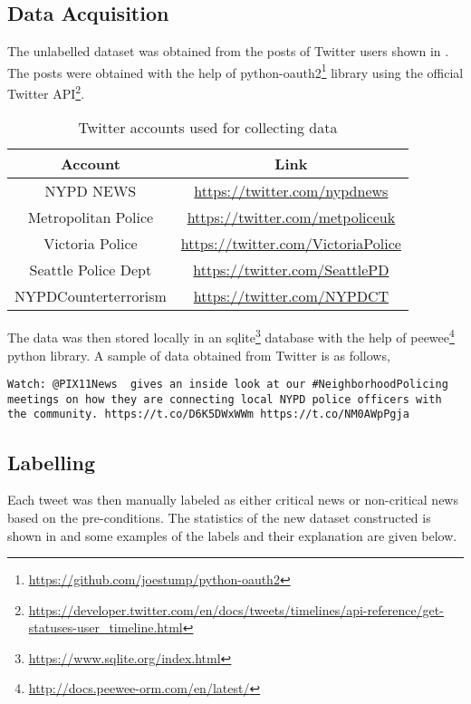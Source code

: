 \subsection{Data Acquisition}
The unlabelled dataset was obtained from the posts of Twitter users shown in . The posts were obtained with the help of python-oauth2\footnote{\url{https://github.com/joestump/python-oauth2}} library using the official Twitter API\footnote{\url{https://developer.twitter.com/en/docs/tweets/timelines/api-reference/get-statuses-user_timeline.html}}.

\begin{table}
    \centering
    \caption{Twitter accounts used for collecting data}
    \label{tbl:twitter_users}
    \begin{tabular}{c|c}
    \toprule
    Account & Link \\
    \midrule
    NYPD NEWS & \url{https://twitter.com/nypdnews} \\
    Metropolitan Police & \url{https://twitter.com/metpoliceuk} \\
    Victoria Police & \url{https://twitter.com/VictoriaPolice} \\
    Seattle Police Dept & \url{https://twitter.com/SeattlePD} \\
    NYPDCounterterrorism & \url{https://twitter.com/NYPDCT} \\
    \bottomrule
    \end{tabular}
\end{table}

The data was then stored locally in an sqlite\footnote{\url{https://www.sqlite.org/index.html}} database with the help of peewee\footnote{\url{http://docs.peewee-orm.com/en/latest/}} python library. A sample of data obtained from Twitter is as follows,

\begin{verbatim}
Watch: @PIX11News  gives an inside look at our #NeighborhoodPolicing
meetings on how they are connecting local NYPD police officers with
the community. https://t.co/D6K5DWxWWm https://t.co/NM0AWpPgja
\end{verbatim}

\subsection{Labelling}
Each tweet was then manually labeled as either critical news or non-critical news based on the pre-conditions. The statistics of the new dataset constructed is shown in   and some examples of the labels and their explanation are given below.

